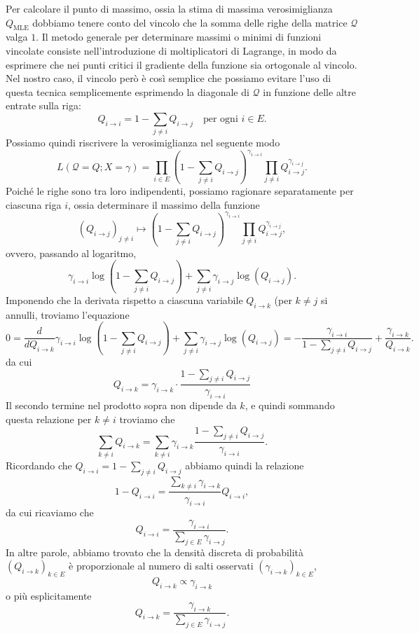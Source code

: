 \documentclass[
  italian,
  letterpaper,
]{book}
\newcommand{\mle}{\operatorname{MLE}}
\theoremstyle{definition}
\theoremstyle{remark}
\begin{document}
Per calcolare il punto di massimo, ossia la stima di massima
verosimiglianza \(Q_{\mle}\) dobbiamo tenere conto del vincolo che la
somma delle righe della matrice \(\mathcal{Q}\) valga \(1\). Il metodo
generale per determinare massimi o minimi di funzioni vincolate consiste
nell'introduzione di moltiplicatori di Lagrange, in modo da esprimere
che nei punti critici il gradiente della funzione sia ortogonale al
vincolo. Nel nostro caso, il vincolo però è così semplice che possiamo
evitare l'uso di questa tecnica semplicemente esprimendo la diagonale di
\(\mathcal{Q}\) in funzione delle altre entrate sulla riga:
\[ Q_{i \to i} = 1 - \sum_{j \neq i} Q_{i \to j} \quad \text{per ogni $i \in E$.}\]
Possiamo quindi riscrivere la verosimiglianza nel seguente modo
\[ L( \mathcal{Q} = Q ; X=\gamma) = \prod_{i\in E}(1- \sum_{j \neq i} Q_{i \to j})^{\gamma_{i \to i}} \prod_{j \neq i}Q_{i\to j}^{\gamma_{i \to j}}.\]
Poiché le righe sono tra loro indipendenti, possiamo ragionare
separatamente per ciascuna riga \(i\), ossia determinare il massimo
della funzione
\[(Q_{i\to j})_{j \neq i} \mapsto (1- \sum_{j \neq i} Q_{i \to j})^{\gamma_{i \to i}}  \prod_{j \neq i} Q_{i \to j}^{\gamma_{i \to j}},\]
ovvero, passando al logaritmo,
\[ \gamma_{i\to i} \log (1- \sum_{j \neq i} Q_{i \to j})  +\sum_{j \neq i} \gamma_{i \to j} \log(Q_{i \to j}).\]
Imponendo che la derivata rispetto a ciascuna variabile \(Q_{i\to k}\)
(per \(k \neq j\) si annulli, troviamo l'equazione
\[0 = \frac{d}{d Q_{i\to k}} \gamma_{i\to i} \log (1- \sum_{j \neq i} Q_{i \to j})  +\sum_{j \neq i} \gamma_{i \to j} \log(Q_{i \to j}) = -\frac{\gamma_{i \to i}}{1- \sum_{j \neq i} Q_{i \to j}} + \frac{\gamma_{i \to k}}{Q_{i \to k}}.\]
da cui
\[ Q_{i \to k} = \gamma_{i \to k} \cdot \frac{1- \sum_{j \neq i} Q_{i \to j}}{\gamma_{i \to i}}\]
Il secondo termine nel prodotto sopra non dipende da \(k\), e quindi
sommando questa relazione per \(k \neq i\) troviamo che
\[ \sum_{k \neq i} Q_{i \to k} = \sum_{k \neq i} \gamma_{i \to k } \frac{1- \sum_{j \neq i} Q_{i \to j}}{\gamma_{i \to i}}.\]
Ricordando che \(Q_{i \to i} = 1- \sum_{j \neq i} Q_{i \to j}\) abbiamo
quindi la relazione
\[ 1- Q_{i \to i} = \frac{ \sum_{k \neq i} \gamma_{i \to k } }{ \gamma_{i \to i}} Q_{i \to i},\]
da cui ricaviamo che
\[Q _{i \to i} = \frac{\gamma_{i \to i}}{\sum_{j \in E }\gamma_{i \to j}}.\]
In altre parole, abbiamo trovato che la densità discreta di probabilità
\((Q_{i \to k})_{k \in E}\) è proporzionale al numero di salti osservati
\((\gamma_{i \to k})_{k \in E}\),
\[ Q_{i \to k} \propto \gamma_{i \to k}\] o più esplicitamente
\[ Q_{i \to k} = \frac{\gamma_{i \to k}}{\sum_{j \in E } \gamma_{i \to j}}.\]
\end{document}
